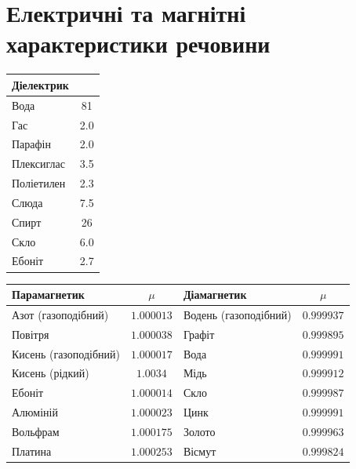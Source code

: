 
\newpage
\section{Електричні та магнітні характеристики речовини}

\begin{table}[h!]\centering
	\label{tab:Dielectric}
	\small
	\begin{tabular}{lc}
		\toprule
		Діелектрик & \epsilon \\ \midrule
		Вода       & 81       \\
		Гас        & 2.0      \\
		Парафін    & 2.0      \\
		Плексиглас & 3.5      \\
		Поліетилен & 2.3      \\
		Слюда      & 7.5      \\
		Спирт      & 26       \\
		Скло       & 6.0      \\
		Ебоніт     & 2.7      \\ \bottomrule
	\end{tabular}
\end{table}

\begin{table}[h!]\centering
	\label{tab:Magnetic}
	\small
	\begin{tabular}{lclc}
		\toprule
		Парамагнетик          & $\mu$      & Діамагнетик           & $\mu$      \\ \midrule
		Азот (газоподібний)   & $1.000013$ & Водень (газоподібний) & $0.999937$ \\
		Повітря               & $1.000038$ & Графіт                & $0.999895$ \\
		Кисень (газоподібний) & $1.000017$ & Вода                  & $0.999991$ \\
		Кисень (рідкий)       & $1.0034$   & Мідь                  & $0.999912$ \\
		Ебоніт                & $1.000014$ & Скло                  & $0.999987$ \\
		Алюміній              & $1.000023$ & Цинк                  & $0.999991$ \\
		Вольфрам              & $1.000175$ & Золото                & $0.999963$ \\
		Платина               & $1.000253$ & Вісмут                & $0.999824$ \\ \bottomrule
	\end{tabular}
\end{table}
